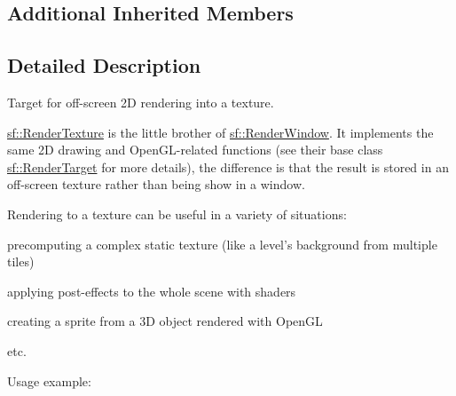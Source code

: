 \subsection*{Additional Inherited Members}


\subsection{Detailed Description}
Target for off-\/screen 2\-D rendering into a texture. 

\hyperlink{classsf_1_1_render_texture}{sf\-::\-Render\-Texture} is the little brother of \hyperlink{classsf_1_1_render_window}{sf\-::\-Render\-Window}. It implements the same 2\-D drawing and Open\-G\-L-\/related functions (see their base class \hyperlink{classsf_1_1_render_target}{sf\-::\-Render\-Target} for more details), the difference is that the result is stored in an off-\/screen texture rather than being show in a window.

Rendering to a texture can be useful in a variety of situations\-: \begin{DoxyItemize}
\item precomputing a complex static texture (like a level's background from multiple tiles) \item applying post-\/effects to the whole scene with shaders \item creating a sprite from a 3\-D object rendered with Open\-G\-L \item etc.\end{DoxyItemize}
Usage example\-:


